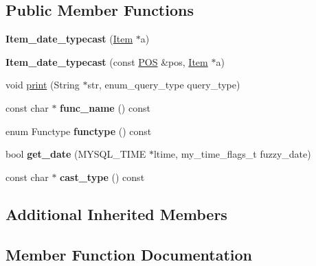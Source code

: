 \subsection*{Public Member Functions}
\begin{DoxyCompactItemize}
\item 
\mbox{\label{classItem__date__typecast_a7c52e8b4b388e4a761889cb956ea50bd}} 
{\bfseries Item\+\_\+date\+\_\+typecast} (\mbox{\hyperlink{classItem}{Item}} $\ast$a)
\item 
\mbox{\label{classItem__date__typecast_ab296934c5c17392db5e23506a3c452a9}} 
{\bfseries Item\+\_\+date\+\_\+typecast} (const \mbox{\hyperlink{structYYLTYPE}{P\+OS}} \&pos, \mbox{\hyperlink{classItem}{Item}} $\ast$a)
\item 
void \mbox{\hyperlink{classItem__date__typecast_a57c9ad045bd8ff8cebe022dd4868f47c}{print}} (String $\ast$str, enum\+\_\+query\+\_\+type query\+\_\+type)
\item 
\mbox{\label{classItem__date__typecast_a6bd7c99f1c625304b274e7afb1e17607}} 
const char $\ast$ {\bfseries func\+\_\+name} () const
\item 
\mbox{\label{classItem__date__typecast_a6f9740835a1f5d295549eeb97038c444}} 
enum Functype {\bfseries functype} () const
\item 
\mbox{\label{classItem__date__typecast_a70c75ea207f6b8d85fbace0b4fa47d82}} 
bool {\bfseries get\+\_\+date} (M\+Y\+S\+Q\+L\+\_\+\+T\+I\+ME $\ast$ltime, my\+\_\+time\+\_\+flags\+\_\+t fuzzy\+\_\+date)
\item 
\mbox{\label{classItem__date__typecast_a7d00e0d5b3a4a2ed599302f59b793d23}} 
const char $\ast$ {\bfseries cast\+\_\+type} () const
\end{DoxyCompactItemize}
\subsection*{Additional Inherited Members}


\subsection{Member Function Documentation}
\mbox{\label{classItem__date__typecast_a57c9ad045bd8ff8cebe022dd4868f47c}} 
